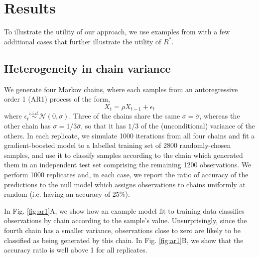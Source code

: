 \documentclass{article}
\begin{document}
\section{Results}\label{sec:results}
To illustrate the utility of our approach, we use examples from \cite{vehtari2019rank} with a few additional cases that further illustrate the utility of $R^*$.

\subsection{Heterogeneity in chain variance}\label{sec:heterogeneity}
We generate four Markov chains, where each samples from an autoregressive order 1 (AR1) process of the form,
%
\begin{equation}
X_t = \rho X_{t-1} + \epsilon_t
\end{equation}
%
where $\epsilon_t\stackrel{i.i.d.}{\sim}\mathcal{N}(0, \sigma)$. Three of the chains share the same $\sigma=\bar{\sigma}$, whereas the other chain has $\sigma=1/3\bar{\sigma}$, so that it has $1/3$ of the (unconditional) variance of the others. In each replicate, we simulate 1000 iterations from all four chains and fit a gradient-boosted model to a labelled training set of 2800 randomly-chosen samples, and use it to classify samples according to the chain which generated them in an independent test set comprising the remaining 1200 observations. We perform 1000 replicates and, in each case, we report the ratio of accuracy of the predictions to the null model which assigns observations to chains uniformly at random (i.e. having an accuracy of 25\%).

In Fig. \ref{fig:ar1}A, we show how an example model fit to training data classifies observations by chain according to the sample's value. Unsurprisingly, since the fourth chain has a smaller variance, observations close to zero are likely to be classified as being generated by this chain. In Fig. \ref{fig:ar1}B, we show that the accuracy ratio is well above 1 for all replicates.

\end{document}

